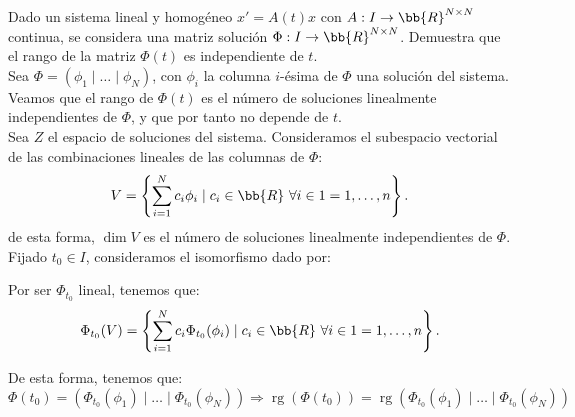 \documentclass[12pt]{article}
\begin{document}
    \begin{ejercicio}
        Dado un sistema lineal y homogéneo $x' = A(t)x$ con $A: I \to \bb{R}^{N\times N}$ continua, se considera una matriz solución $\Phi: I \to \bb{R}^{N\times N}$. Demuestra que el rango de la matriz $\Phi(t)$ es independiente de $t$.\\

        Sea $\Phi=(\phi_1\mid \dots\mid \phi_N)$, con $\phi_i$ la columna $i$-ésima de $\Phi$ una solución del sistema. Veamos que el rango de $\Phi(t)$ es el número de soluciones linealmente independientes de $\Phi$, y que por tanto no depende de $t$.\\

        Sea $Z$ el espacio de soluciones del sistema. Consideramos el subespacio vectorial de las combinaciones lineales de las columnas de $\Phi$:
        \begin{equation*}
            V=\left\{\sum_{i=1}^{N}c_i\phi_i\mid c_i\in \bb{R}~\forall i\in 1=1,\dots,n\right\}.
        \end{equation*}
        de esta forma, $\dim V$ es el número de soluciones linealmente independientes de $\Phi$.\\

        Fijado $t_0\in I$, consideramos el isomorfismo dado por:

        Por ser $\Phi_{t_0}$ lineal, tenemos que:
        \begin{equation*}
            \Phi_{t_0}(V)=\left\{\sum_{i=1}^{N}c_i\Phi_{t_0}(\phi_i)\mid c_i\in \bb{R}~\forall i\in 1=1,\dots,n\right\}.
        \end{equation*}

        De esta forma, tenemos que:
        \begin{equation*}
            \Phi(t_0)=\left(\Phi_{t_0}(\phi_1)\mid \dots\mid \Phi_{t_0}(\phi_N)\right)
            \Longrightarrow
            \operatorname{rg}(\Phi(t_0))=\operatorname{rg}(\Phi_{t_0}(\phi_1)\mid \dots\mid \Phi_{t_0}(\phi_N))
        \end{equation*}


\end{ejercicio}
\end{document}
